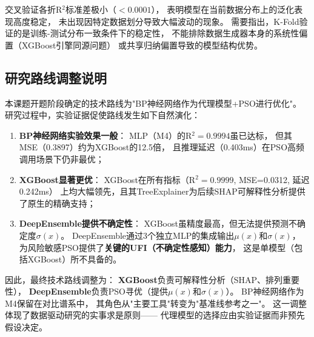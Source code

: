 交叉验证各折R$^2$标准差极小（$< 0.0001$），
表明模型在当前数据分布上的泛化表现高度稳定，
未出现因特定数据划分导致大幅波动的现象。
需要指出，K-Fold验证的是训练-测试分布一致条件下的稳定性，
不能排除数据生成器本身的系统性偏置（XGBoost引擎同源问题）
或共享归纳偏置导致的模型结构优势。

\subsection{研究路线调整说明}

本课题开题阶段确定的技术路线为"BP神经网络作为代理模型+PSO进行优化"。
研究过程中，实验证据促使路线发生如下自然演化：

\begin{enumerate}
    \item \textbf{BP神经网络实验效果一般}：
        MLP（M4）的R$^2=0.9994$虽已达标，
        但其MSE（0.3897）约为XGBoost的12.5倍，
        且推理延迟（0.403ms）在PSO高频调用场景下仍非最优；

    \item \textbf{XGBoost显著更优}：
        XGBoost在所有指标（R$^2=0.9999$, MSE=0.0312, 延迟0.242ms）
        上均大幅领先，且其TreeExplainer为后续SHAP可解释性分析提供了原生的精确支持；

    \item \textbf{DeepEnsemble提供不确定性}：
        XGBoost虽精度最高，但无法提供预测不确定度$\sigma(x)$。
        DeepEnsemble通过3个独立MLP的集成输出$\mu(x)$和$\sigma(x)$，
        为风险敏感PSO提供了\textbf{关键的UFI（不确定性感知）能力}，
        这是单模型（包括XGBoost）所不具备的。
\end{enumerate}

因此，最终技术路线调整为：
\textbf{XGBoost}负责可解释性分析（SHAP、排列重要性），
\textbf{DeepEnsemble}负责PSO寻优（提供$\mu(x)$和$\sigma(x)$）。
BP神经网络作为M4保留在对比谱系中，
其角色从"主要工具"转变为"基准线参考之一"。
这一调整体现了数据驱动研究的实事求是原则——
代理模型的选择应由实验证据而非预先假设决定。
